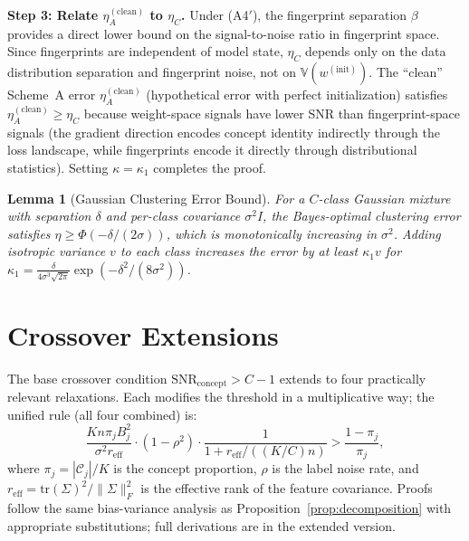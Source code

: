 \documentclass[11pt]{article}
\newcommand{\V}{\mathbb{V}}
\newcommand{\cC}{\mathcal{C}}
\newcommand{\SNR}{\mathrm{SNR}_{\mathrm{concept}}}
\newtheorem{lemma}[theorem]{Lemma}
\begin{document}
\textbf{Step 3: Relate $\eta_A^{(\mathrm{clean})}$ to $\eta_C$.}
Under (A4$'$), the fingerprint separation $\beta$ provides a direct lower bound on the signal-to-noise ratio in fingerprint space.
Since fingerprints are independent of model state, $\eta_C$ depends only on the data distribution separation and fingerprint noise, not on $\V(w^{(\mathrm{init})})$.
The ``clean'' Scheme~A error $\eta_A^{(\mathrm{clean})}$ (hypothetical error with perfect initialization) satisfies $\eta_A^{(\mathrm{clean})} \ge \eta_C$ because weight-space signals have lower SNR than fingerprint-space signals (the gradient direction encodes concept identity indirectly through the loss landscape, while fingerprints encode it directly through distributional statistics).
Setting $\kappa = \kappa_1$ completes the proof.

\begin{lemma}[Gaussian Clustering Error Bound]
\label{lem:gaussian_clustering}
For a $C$-class Gaussian mixture with separation $\delta$ and per-class covariance $\sigma^2 I$, the Bayes-optimal clustering error satisfies $\eta \ge \Phi(-\delta/(2\sigma))$, which is monotonically increasing in $\sigma^2$.
Adding isotropic variance $v$ to each class increases the error by at least $\kappa_1 v$ for $\kappa_1 = \frac{\delta}{4\sigma^3\sqrt{2\pi}} \exp(-\delta^2/(8\sigma^2))$.
\end{lemma}


\section{Crossover Extensions}
\label{app:extensions}

The base crossover condition $\SNR > C{-}1$ extends to four practically relevant relaxations.
Each modifies the threshold in a multiplicative way; the unified rule (all four combined) is:
\begin{equation}
\frac{Kn\pi_j B_j^2}{\sigma^2 r_{\mathrm{eff}}} \cdot (1 - \rho^2) \cdot \frac{1}{1 + r_{\mathrm{eff}} / ((K/C)n)} > \frac{1-\pi_j}{\pi_j},
\end{equation}
where $\pi_j = |\cC_j|/K$ is the concept proportion, $\rho$ is the label noise rate, and $r_{\mathrm{eff}} = \mathrm{tr}(\Sigma)^2 / \|\Sigma\|_F^2$ is the effective rank of the feature covariance.
Proofs follow the same bias-variance analysis as Proposition~\ref{prop:decomposition} with appropriate substitutions; full derivations are in the extended version.
\end{document}
